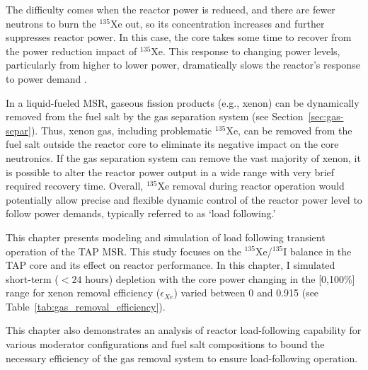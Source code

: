 The difficulty comes when the reactor power is reduced, and there are fewer 
neutrons to burn the $^{135}$Xe out, so its concentration increases and 
further suppresses reactor power. In this case, the core takes some time to 
recover from the power reduction impact of $^{135}$Xe. This response to 
changing power levels, particularly from higher to lower power, 
dramatically slows the reactor's response to power demand
\cite{lokhov_load-following_2011}. 

In a liquid-fueled \gls{MSR}, gaseous fission products (e.g., xenon) can be 
dynamically removed from the fuel salt by the gas separation system (see 
Section~\ref{sec:gas-separ}). Thus, xenon gas, including problematic 
$^{135}$Xe, can be removed from the fuel salt outside the reactor core to 
eliminate its negative impact on the core neutronics. If the gas separation 
system can remove the vast majority of xenon, it is possible to alter the 
reactor power output in a wide range with very brief required recovery time. 
Overall, $^{135}$Xe removal during reactor operation would potentially allow 
precise and flexible dynamic control of the reactor power level to follow 
power demands, typically referred to as `load following.'

This chapter presents modeling and simulation of load following transient 
operation of the \gls{TAP} \gls{MSR}. This study focuses on the 
$^{135}$Xe/$^{135}$I balance in the \gls{TAP} core and its effect on 
reactor performance. In this chapter, I simulated short-term ($<24$ hours) 
depletion with the core power changing in the [0,100\%] range for xenon 
removal efficiency ($\epsilon_{Xe}$) varied between 0 and 0.915 (see 
Table~\ref{tab:gas_removal_efficiency}). 

This chapter also demonstrates an analysis of reactor load-following 
capability for various moderator configurations and fuel salt compositions to 
bound the necessary efficiency of the gas removal system to ensure 
load-following operation. 

